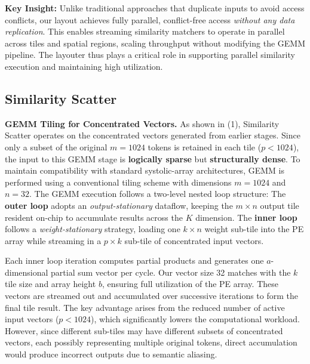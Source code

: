\textbf{Key Insight:}  
Unlike traditional approaches that duplicate inputs to avoid access conflicts, our layout achieves fully parallel, conflict-free access \textit{without any data replication}. 
This enables streaming similarity matchers to operate in parallel across tiles and spatial regions, scaling throughput without modifying the GEMM pipeline. 
The layouter thus plays a critical role in supporting parallel similarity execution and maintaining high utilization.

\subsection{Similarity Scatter}
\label{subsec:scatter}

\textbf{GEMM Tiling for Concentrated Vectors.}
As shown in (1), Similarity Scatter operates on the concentrated vectors generated from earlier stages. 
Since only a subset of the original $m=1024$ tokens is retained in each tile ($p < 1024$), the input to this GEMM stage is \textbf{logically sparse} but \textbf{structurally dense}. 
To maintain compatibility with standard systolic-array architectures, GEMM is performed using a conventional tiling scheme with dimensions $m=1024$ and $n=32$.
The GEMM execution follows a two-level nested loop structure:
The \textbf{outer loop} adopts an \textit{output-stationary} dataflow, keeping the $m \times n$ output tile resident on-chip to accumulate results across the $K$ dimension.
The \textbf{inner loop} follows a \textit{weight-stationary} strategy, loading one $k \times n$ weight sub-tile into the PE array while streaming in a $p \times k$ sub-tile of concentrated input vectors.

Each inner loop iteration computes partial products and generates one $a$-dimensional partial sum vector per cycle. Our vector size 32 matches with the $k$ tile size and array height $b$, ensuring full utilization of the PE array.
These vectors are streamed out and accumulated over successive iterations to form the final tile result.
The key advantage arises from the reduced number of active input vectors ($p < 1024$), which significantly lowers the computational workload. 
However, since different sub-tiles may have different subsets of concentrated vectors, each possibly representing multiple original tokens, direct accumulation would produce incorrect outputs due to semantic aliasing.

